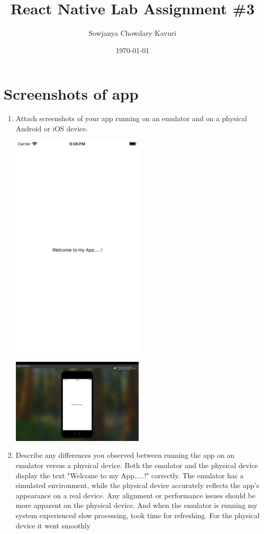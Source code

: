 \documentclass[a4paper,12pt]{article}
\title{React Native Lab Assignment \#3}
\author{Sowjanya Chowdary Kavuri}
\date{\today}
\begin{document}
\maketitle

\section{Screenshots of app}
\begin{enumerate}
    \item Attach screenshots of your app running on an emulator and on a physical Android or iOS device.

\includegraphics[width=0.5\textwidth]{emulator.jpeg}
\includegraphics[width=0.5\textwidth]{phone.jpeg}

    \item Describe any differences you observed between running the app on an emulator
versus a physical device.
Both the emulator and the physical device display the text "Welcome to my App.....!" correctly.
The emulator has a simulated environment, while the physical device accurately reflects the app's appearance on a real device. Any alignment or performance issues should be more apparent on the physical device. And when the emulator is running my system experienced slow processing, took time for refreshing. For the physical device it went smoothly
\end{enumerate}
\end{document}
